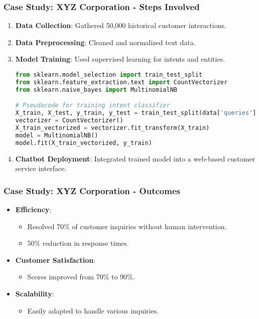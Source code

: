 \documentclass[aspectratio=169]{beamer}
\begin{document}
\begin{frame}[fragile]
    \frametitle{Case Study: XYZ Corporation - Steps Involved}
    \begin{enumerate}
        \item \textbf{Data Collection}: Gathered 50,000 historical customer interactions.
        \item \textbf{Data Preprocessing}: Cleaned and normalized text data.
        \item \textbf{Model Training}: Used supervised learning for intents and entities.
        \begin{lstlisting}[language=Python]
from sklearn.model_selection import train_test_split
from sklearn.feature_extraction.text import CountVectorizer
from sklearn.naive_bayes import MultinomialNB

# Pseudocode for training intent classifier
X_train, X_test, y_train, y_test = train_test_split(data['queries'], data['intents'], test_size=0.2)
vectorizer = CountVectorizer()
X_train_vectorized = vectorizer.fit_transform(X_train)
model = MultinomialNB()
model.fit(X_train_vectorized, y_train)
        \end{lstlisting}
        \item \textbf{Chatbot Deployment}: Integrated trained model into a web-based customer service interface.
    \end{enumerate}
\end{frame}

\begin{frame}
    \frametitle{Case Study: XYZ Corporation - Outcomes}
    \begin{itemize}
        \item \textbf{Efficiency}: 
            \begin{itemize}
                \item Resolved 70\% of customer inquiries without human intervention.
                \item 50\% reduction in response times.
            \end{itemize}
        \item \textbf{Customer Satisfaction}: 
            \begin{itemize}
                \item Scores improved from 70\% to 90\%.
            \end{itemize}
        \item \textbf{Scalability}: 
            \begin{itemize}
                \item Easily adapted to handle various inquiries.
            \end{itemize}
    \end{itemize}
\end{frame}
\end{document}
